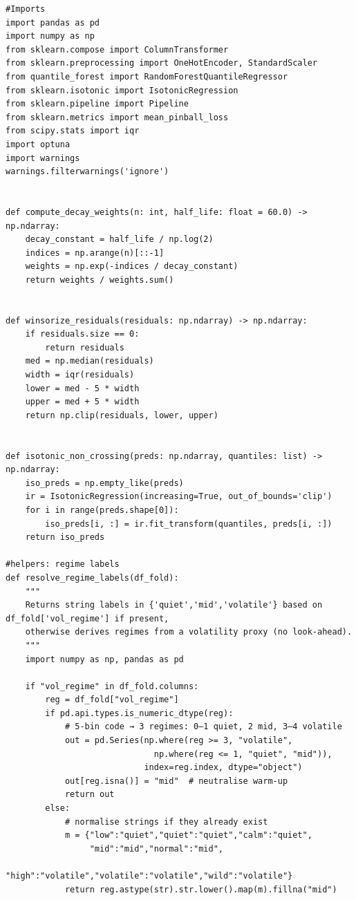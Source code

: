 \documentclass[
  a4paper,
  DIV=11,
  numbers=noendperiod]{scrreprt}
\begin{document}
\begin{verbatim}
#Imports
import pandas as pd
import numpy as np
from sklearn.compose import ColumnTransformer
from sklearn.preprocessing import OneHotEncoder, StandardScaler
from quantile_forest import RandomForestQuantileRegressor
from sklearn.isotonic import IsotonicRegression
from sklearn.pipeline import Pipeline
from sklearn.metrics import mean_pinball_loss
from scipy.stats import iqr
import optuna
import warnings
warnings.filterwarnings('ignore')


def compute_decay_weights(n: int, half_life: float = 60.0) -> np.ndarray:
    decay_constant = half_life / np.log(2)
    indices = np.arange(n)[::-1]
    weights = np.exp(-indices / decay_constant)
    return weights / weights.sum()


def winsorize_residuals(residuals: np.ndarray) -> np.ndarray:
    if residuals.size == 0:
        return residuals
    med = np.median(residuals)
    width = iqr(residuals)
    lower = med - 5 * width
    upper = med + 5 * width
    return np.clip(residuals, lower, upper)


def isotonic_non_crossing(preds: np.ndarray, quantiles: list) -> np.ndarray:
    iso_preds = np.empty_like(preds)
    ir = IsotonicRegression(increasing=True, out_of_bounds='clip')
    for i in range(preds.shape[0]):
        iso_preds[i, :] = ir.fit_transform(quantiles, preds[i, :])
    return iso_preds

#helpers: regime labels 
def resolve_regime_labels(df_fold):
    """
    Returns string labels in {'quiet','mid','volatile'} based on df_fold['vol_regime'] if present,
    otherwise derives regimes from a volatility proxy (no look-ahead).
    """
    import numpy as np, pandas as pd

    if "vol_regime" in df_fold.columns:
        reg = df_fold["vol_regime"]
        if pd.api.types.is_numeric_dtype(reg):
            # 5-bin code → 3 regimes: 0–1 quiet, 2 mid, 3–4 volatile
            out = pd.Series(np.where(reg >= 3, "volatile",
                              np.where(reg <= 1, "quiet", "mid")),
                            index=reg.index, dtype="object")
            out[reg.isna()] = "mid"  # neutralise warm-up
            return out
        else:
            # normalise strings if they already exist
            m = {"low":"quiet","quiet":"quiet","calm":"quiet",
                 "mid":"mid","normal":"mid",
                 "high":"volatile","volatile":"volatile","wild":"volatile"}
            return reg.astype(str).str.lower().map(m).fillna("mid")


\end{verbatim}
\end{document}
